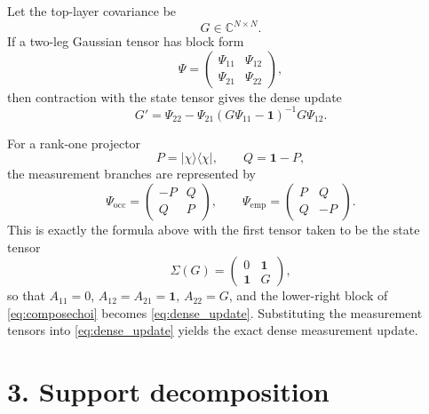 \documentclass[11pt]{article}
\newcommand{\I}{\mathbf{1}}
\begin{document}
Let the top-layer covariance be
\begin{equation}
G \in \mathbb{C}^{N \times N}.
\end{equation}
If a two-leg Gaussian tensor has block form
\begin{equation}
\Psi =
\begin{pmatrix}
\Psi_{11} & \Psi_{12} \\
\Psi_{21} & \Psi_{22}
\end{pmatrix},
\end{equation}
then contraction with the state tensor gives the dense update
\begin{equation}
G' = \Psi_{22} - \Psi_{21}(G\Psi_{11} - \I)^{-1} G \Psi_{12}.
\label{eq:dense_update}
\end{equation}

For a rank-one projector
\begin{equation}
P = |\chi\rangle\langle \chi|, \qquad Q = \I - P,
\end{equation}
the measurement branches are represented by
\begin{equation}
\Psi_{\mathrm{occ}} =
\begin{pmatrix}
-P & Q \\
Q & P
\end{pmatrix},
\qquad
\Psi_{\mathrm{emp}} =
\begin{pmatrix}
P & Q \\
Q & -P
\end{pmatrix}.
\end{equation}
This is exactly the formula above with the first tensor taken to be the state
tensor
\begin{equation}
\Sigma(G) =
\begin{pmatrix}
0 & \I \\
\I & G
\end{pmatrix},
\end{equation}
so that $A_{11}=0$, $A_{12}=A_{21}=\I$, $A_{22}=G$, and the lower-right block of
\eqref{eq:composechoi} becomes \eqref{eq:dense_update}. Substituting the
measurement tensors into \eqref{eq:dense_update} yields the exact dense
measurement update.

\section*{3. Support decomposition}
\end{document}
